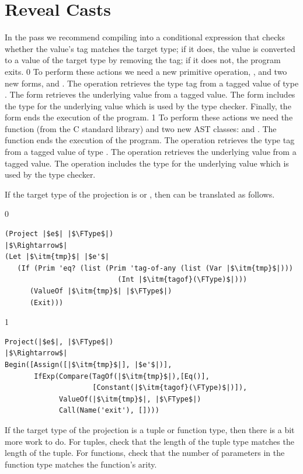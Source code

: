 \documentclass[7x10,nocrop]{TimesAPriori_MIT}%
\def\racketEd{0}
\def\pythonEd{1}
\def\edition{0}
\begin{document}
\section{Reveal Casts}
\label{sec:reveal-casts-Rany}


In the  pass we recommend compiling 
into a conditional expression that checks whether the value's tag
matches the target type; if it does, the value is converted to a value
of the target type by removing the tag; if it does not, the program
exits.
%
{\if\edition\racketEd
%
To perform these actions we need a new primitive operation,
, and two new forms,  and .
The  operation retrieves the type tag from a tagged
value of type .  The  form retrieves the
underlying value from a tagged value.  The  form
includes the type for the underlying value which is used by the type
checker.  Finally, the  form ends the execution of the
program.
%
\fi}
%
{\if\edition\pythonEd
%
To perform these actions we need the  function (from the C
standard library) and two new AST classes:  and
. The  function ends the execution of the
program.  The  operation retrieves the type tag from a
tagged value of type \ANYTY{}.  The  operation retrieves
the underlying value from a tagged value.  The 
operation includes the type for the underlying value which is used by
the type checker.
%
\fi}


If the target type of the projection is \BOOLTY{} or \INTTY{}, then
 can be translated as follows.
\begin{center}
\begin{minipage}{1.0\textwidth}
{\if\edition\racketEd    
\begin{lstlisting}
(Project |$e$| |$\FType$|)
|$\Rightarrow$|
(Let |$\itm{tmp}$| |$e'$|
   (If (Prim 'eq? (list (Prim 'tag-of-any (list (Var |$\itm{tmp}$|)))
                           (Int |$\itm{tagof}(\FType)$|)))
      (ValueOf |$\itm{tmp}$| |$\FType$|)
      (Exit)))
\end{lstlisting}
\fi}
{\if\edition\pythonEd
\begin{lstlisting}
Project(|$e$|, |$\FType$|)
|$\Rightarrow$|
Begin([Assign([|$\itm{tmp}$|], |$e'$|)],
       IfExp(Compare(TagOf(|$\itm{tmp}$|),[Eq()],
                     [Constant(|$\itm{tagof}(\FType)$|)]),
             ValueOf(|$\itm{tmp}$|, |$\FType$|)
             Call(Name('exit'), [])))
\end{lstlisting}
\fi}
\end{minipage}
\end{center}
If the target type of the projection is a tuple or function type, then
there is a bit more work to do. For tuples, check that the length of
the tuple type matches the length of the tuple. For functions, check
that the number of parameters in the function type matches the
function's arity.
\end{document}
